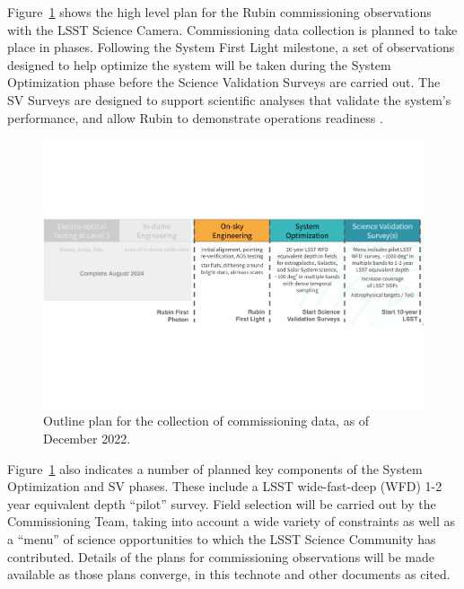 Figure~\ref{fig:commissioning} shows the high level plan for the Rubin commissioning observations with the LSST Science Camera.
Commissioning data collection is planned to take place in phases.
Following the System First Light milestone, a set of observations designed to help optimize the system will be taken during the System Optimization phase before the Science Validation Surveys are carried out. 
The SV Surveys are designed to support scientific analyses that validate the system's performance, and allow Rubin to demonstrate operations readiness \citep{SITCOMTN-005}.

\begin{figure}[htb]
\centering
\includegraphics[width=0.95\linewidth]{figures/commissioning-plan}
\caption{Outline plan for the collection of commissioning data, as of December 2022.}
\label{fig:commissioning}
\end{figure}

Figure~\ref{fig:commissioning} also indicates a number of planned key components of the System Optimization and SV phases.
These include a LSST wide-fast-deep (WFD) 1-2 year equivalent depth ``pilot'' survey.
Field selection will be carried out by the Commissioning Team, taking into account a wide variety of constraints as well as a ``menu'' of science opportunities to which the LSST Science Community has contributed.
Details of the plans for commissioning observations will be made available as those plans converge, in this technote and other documents as cited.





